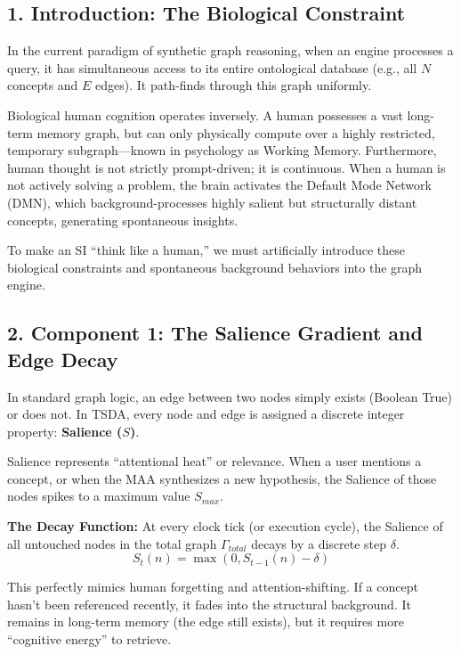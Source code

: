 \documentclass[
  11pt,
  a4paper,
]{article}
\begin{document}
\subsection{1. Introduction: The Biological
Constraint}\label{introduction-the-biological-constraint}

In the current paradigm of synthetic graph reasoning, when an engine
processes a query, it has simultaneous access to its entire ontological
database (e.g., all \(N\) concepts and \(E\) edges). It path-finds
through this graph uniformly.

Biological human cognition operates inversely. A human possesses a vast
long-term memory graph, but can only physically compute over a highly
restricted, temporary subgraph---known in psychology as Working Memory.
Furthermore, human thought is not strictly prompt-driven; it is
continuous. When a human is not actively solving a problem, the brain
activates the Default Mode Network (DMN), which background-processes
highly salient but structurally distant concepts, generating spontaneous
insights.

To make an SI ``think like a human,'' we must artificially introduce
these biological constraints and spontaneous background behaviors into
the graph engine.

\subsection{2. Component 1: The Salience Gradient and Edge
Decay}\label{component-1-the-salience-gradient-and-edge-decay}

In standard graph logic, an edge between two nodes simply exists
(Boolean True) or does not. In TSDA, every node and edge is assigned a
discrete integer property: \textbf{Salience (\(S\))}.

Salience represents ``attentional heat'' or relevance. When a user
mentions a concept, or when the MAA synthesizes a new hypothesis, the
Salience of those nodes spikes to a maximum value \(S_{max}\).

\textbf{The Decay Function:} At every clock tick (or execution cycle),
the Salience of all untouched nodes in the total graph
\(\Gamma_{total}\) decays by a discrete step \(\delta\).
\[ S_t(n) = \max(0, S_{t-1}(n) - \delta) \]

This perfectly mimics human forgetting and attention-shifting. If a
concept hasn't been referenced recently, it fades into the structural
background. It remains in long-term memory (the edge still exists), but
it requires more ``cognitive energy'' to retrieve.
\end{document}
